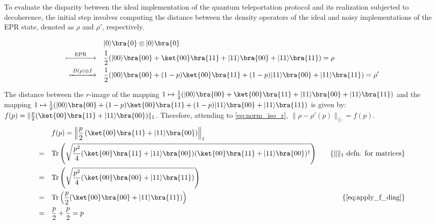 To evaluate the disparity between the ideal implementation of the quantum teleportation protocol and its realization subjected to decoherence, the initial step involves computing the distance between the density operators of the ideal and noisy implementations of the EPR state, denoted as $\rho$ and $\rho'$, respectively.

\begin{equation}
  \begin{split}
& |0\rangle \bra{0} \otimes |0\rangle \bra{0}  \\
\xmapsto{ \hspace{10pt} \text{EPR} \hspace{10pt} } \quad &  \frac{1}{2} (|00\rangle \bra{00} + \ket{00}\bra{11} + |11\rangle \bra{00} + |11\rangle \bra{11}) = \rho \\
\xmapsto{ \hspace{2pt} D(p) \otimes I  \hspace{2pt}} \quad &  \frac{1}{2} (|00\rangle \bra{00} + (1-p) \ket{00}\bra{11} + (1-p) |11\rangle \bra{00} + |11\rangle \bra{11} ) = \rho' \\
  \end{split}
\end{equation}

The distance between the $r$-image of the mapping $1 \mapsto \frac{1}{2} (|00\rangle \bra{00} + \ket{00}\bra{11} + |11\rangle \bra{00} + |11\rangle \bra{11})$ and the mapping $1 \mapsto \frac{1}{2} (|00\rangle \bra{00} + (1-p) \ket{00}\bra{11} + (1-p) |11\rangle \bra{00} + |11\rangle \bra{11} )$ is given by: $f(p)= \lVert\frac{p}{2}(\ket{00}\bra{11}+|11\rangle \bra{00})\rVert_{1}$. Therefore, attending to \autoref{eq:norm_iso_r}, $\lVert \rho-\rho'(p) \rVert_{\diamondsuit} = f(p)$.
\begin{equation}
  \begin{split}
    \quad&f(p) = \left\lVert\frac{p}{2}\left(\ket{00}\bra{11}+|11\rangle \bra{00}\right)\right\rVert_{1} \\
   = \quad &  \text{Tr}\left(\sqrt{\frac{p^{2}}{4}(\ket{00}\bra{11}+|11\rangle \bra{00})(\ket{00}\bra{11}+|11\rangle \bra{00})^{\dag}}\right)  \quad & \{\lVert \rVert_{1} \text{ defn. for matrices}\} \\
   =  \quad &  \text{Tr} \left(\sqrt{ \frac{p^{2}}{4} (\ket{00}\bra{00}+|11\rangle \bra{11})} \right) & \\
    =  \quad &  \text{Tr} \left( \frac{p}{2}(\ket{00}\bra{00}+|11\rangle \bra{11}) \right) & \{ \text{\autoref{eq:apply_f_diag}}\} \\
    =  \quad &  \frac{p}{2} + \frac{p}{2} = p & \\
  \end{split}
\end{equation}

